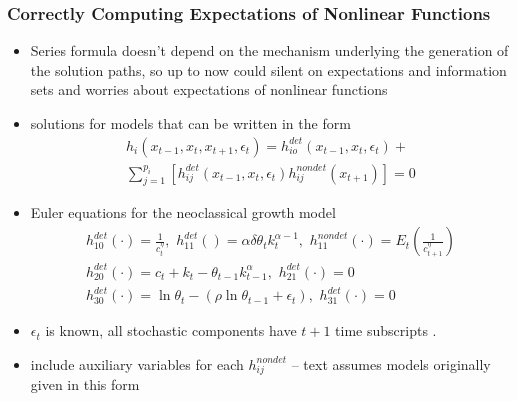 \documentclass[letter]{beamer}
\begin{document}
\begin{frame}
  \frametitle{Correctly Computing Expectations of Nonlinear Functions}
{\small 
  \begin{itemize}
  \item Series formula doesn't depend on the mechanism underlying the generation of the solution paths, so up to now could silent on expectations and information sets and worries about expectations of nonlinear functions
  \item solutions for models that can be written in  the form
\begin{gather}
  h_i(x_{t-1},x_{t},x_{t+1},\epsilon_t)=h^{det}_{io}(x_{t-1},x_{t},\epsilon_t)+\\ 
\sum_{j=1}^{p_i} [h^{det}_{ij}(x_{t-1},x_{t},\epsilon_t)h^{nondet}_{ij}(x_{t+1})]=0
\end{gather}
\item Euler equations for the  neoclassical growth  model 
\label{sec:simple-rbc-model-ext} 
\begin{gather}
h_{10}^{det}(\cdot)=\frac{1}{c_t^\eta},\,\,
h_{11}^{det}()=\alpha \delta \theta_{t}k_{t}^{\alpha-1} ,\,\,
h_{11}^{nondet}(\cdot)=E_t \left (\frac{1}{c_{t+1}^\eta} \right )\\
h_{20}^{det}(\cdot)=c_t + k_t-\theta_{t-1}k_{t-1}^\alpha,\,\,
h_{21}^{det}(\cdot)=0\\
h_{30}^{det}(\cdot)=\ln \theta_t -(\rho \ln \theta_{t-1} + \epsilon_t),\,\,
h_{31}^{det}(\cdot)=0
\end{gather}
\item $\epsilon_t$ is known, all stochastic components have $t+1$ time subscripts . 
\item include auxiliary variables for each $h_{ij}^{nondet}$  -- text assumes models originally given in this form
  \end{itemize}




}
\end{frame}





\end{document}
